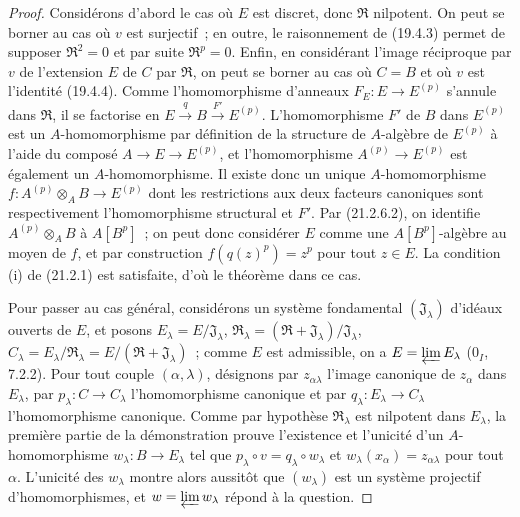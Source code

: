 \begin{proof}
Considérons d'abord le cas où $E$ est discret, donc $\mathfrak R$ nilpotent.
On peut se borner au cas où $v$ est surjectif~; en outre, le raisonnement de
(19.4.3) permet de supposer $\mathfrak R^2=0$ et par suite $\mathfrak R^p=0$.
Enfin, en considérant l'image réciproque par $v$ de l'extension $E$ de $C$
par $\mathfrak R$, on peut se borner au cas où $C=B$ et où $v$ est l'identité
(19.4.4). Comme l'homomorphisme d'anneaux $F_E:E\to E^{(p)}$ s'annule
dans $\mathfrak R$, il se factorise en $E\xrightarrow q B\xrightarrow{F'}E^{(p)}$.
L'homomorphisme $F'$ de $B$ dans $E^{(p)}$ est un $A$-homomorphisme par
définition de la structure de $A$-algèbre de $E^{(p)}$ à l'aide du composé
$A\to E\to E^{(p)}$, et l'homomorphisme $A^{(p)}\to E^{(p)}$ est également
un $A$-homomorphisme. Il existe donc un unique $A$-homomorphisme
$f:A^{(p)}\otimes_A B\to E^{(p)}$ dont les restrictions aux deux facteurs
canoniques sont respectivement l'homomorphisme structural et $F'$.
Par (21.2.6.2), on identifie $A^{(p)}\otimes_A B$ à $A[B^p]$~; on peut
donc considérer $E$ comme une $A[B^p]$-algèbre au moyen de $f$, et par
construction $f(q(z)^p)=z^p$ pour tout $z\in E$. La condition (i) de
(21.2.1) est satisfaite, d'où le théorème dans ce cas.

Pour passer au cas général, considérons un système fondamental
$(\mathfrak J_\lambda)$ d'idéaux ouverts de $E$, et posons
$E_\lambda=E/\mathfrak J_\lambda$, $\mathfrak R_\lambda=(\mathfrak R+\mathfrak J_\lambda)/\mathfrak J_\lambda$,
$C_\lambda=E_\lambda/\mathfrak R_\lambda=E/(\mathfrak R+\mathfrak J_\lambda)$~;
comme $E$ est admissible, on a $E=\varprojlim E_\lambda$ (0$_I$, 7.2.2).
Pour tout couple
$(\alpha,\lambda)$, désignons par $z_{\alpha\lambda}$ l'image canonique de
$z_\alpha$ dans $E_\lambda$, par $p_\lambda:C\to C_\lambda$ l'homomorphisme
canonique et par $q_\lambda:E_\lambda\to C_\lambda$ l'homomorphisme canonique.
Comme par hypothèse $\mathfrak R_\lambda$ est nilpotent dans $E_\lambda$, la
première partie de la démonstration prouve l'existence et l'unicité d'un
$A$-homomorphisme $w_\lambda:B\to E_\lambda$ tel que
$p_\lambda\circ v=q_\lambda\circ w_\lambda$ et
$w_\lambda(x_\alpha)=z_{\alpha\lambda}$ pour tout $\alpha$. L'unicité des
$w_\lambda$ montre alors aussitôt que $(w_\lambda)$ est un système projectif
d'homomorphismes, et $w=\varprojlim w_\lambda$ répond à la question.
\end{proof}

